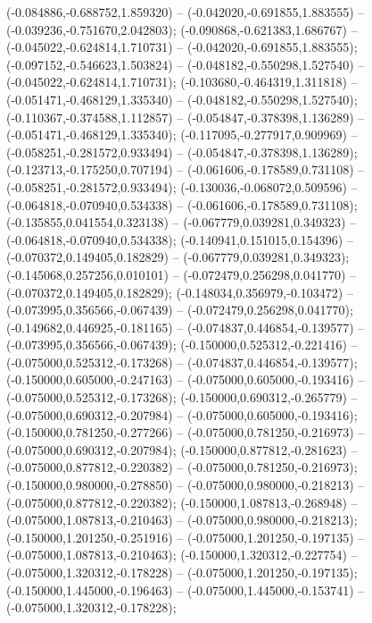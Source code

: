  (-0.084886,-0.688752,1.859320) -- (-0.042020,-0.691855,1.883555) -- (-0.039236,-0.751670,2.042803);
 (-0.090868,-0.621383,1.686767) -- (-0.045022,-0.624814,1.710731) -- (-0.042020,-0.691855,1.883555);
 (-0.097152,-0.546623,1.503824) -- (-0.048182,-0.550298,1.527540) -- (-0.045022,-0.624814,1.710731);
 (-0.103680,-0.464319,1.311818) -- (-0.051471,-0.468129,1.335340) -- (-0.048182,-0.550298,1.527540);
 (-0.110367,-0.374588,1.112857) -- (-0.054847,-0.378398,1.136289) -- (-0.051471,-0.468129,1.335340);
 (-0.117095,-0.277917,0.909969) -- (-0.058251,-0.281572,0.933494) -- (-0.054847,-0.378398,1.136289);
 (-0.123713,-0.175250,0.707194) -- (-0.061606,-0.178589,0.731108) -- (-0.058251,-0.281572,0.933494);
 (-0.130036,-0.068072,0.509596) -- (-0.064818,-0.070940,0.534338) -- (-0.061606,-0.178589,0.731108);
 (-0.135855,0.041554,0.323138) -- (-0.067779,0.039281,0.349323) -- (-0.064818,-0.070940,0.534338);
 (-0.140941,0.151015,0.154396) -- (-0.070372,0.149405,0.182829) -- (-0.067779,0.039281,0.349323);
 (-0.145068,0.257256,0.010101) -- (-0.072479,0.256298,0.041770) -- (-0.070372,0.149405,0.182829);
 (-0.148034,0.356979,-0.103472) -- (-0.073995,0.356566,-0.067439) -- (-0.072479,0.256298,0.041770);
 (-0.149682,0.446925,-0.181165) -- (-0.074837,0.446854,-0.139577) -- (-0.073995,0.356566,-0.067439);
 (-0.150000,0.525312,-0.221416) -- (-0.075000,0.525312,-0.173268) -- (-0.074837,0.446854,-0.139577);
 (-0.150000,0.605000,-0.247163) -- (-0.075000,0.605000,-0.193416) -- (-0.075000,0.525312,-0.173268);
 (-0.150000,0.690312,-0.265779) -- (-0.075000,0.690312,-0.207984) -- (-0.075000,0.605000,-0.193416);
 (-0.150000,0.781250,-0.277266) -- (-0.075000,0.781250,-0.216973) -- (-0.075000,0.690312,-0.207984);
 (-0.150000,0.877812,-0.281623) -- (-0.075000,0.877812,-0.220382) -- (-0.075000,0.781250,-0.216973);
 (-0.150000,0.980000,-0.278850) -- (-0.075000,0.980000,-0.218213) -- (-0.075000,0.877812,-0.220382);
 (-0.150000,1.087813,-0.268948) -- (-0.075000,1.087813,-0.210463) -- (-0.075000,0.980000,-0.218213);
 (-0.150000,1.201250,-0.251916) -- (-0.075000,1.201250,-0.197135) -- (-0.075000,1.087813,-0.210463);
 (-0.150000,1.320312,-0.227754) -- (-0.075000,1.320312,-0.178228) -- (-0.075000,1.201250,-0.197135);
 (-0.150000,1.445000,-0.196463) -- (-0.075000,1.445000,-0.153741) -- (-0.075000,1.320312,-0.178228);
